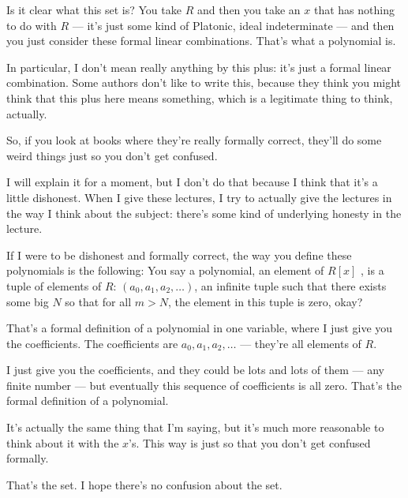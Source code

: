 \begin{speech}[01:20:48 - 01:22:05]
Is it clear what this set is? You take $R$ and then you take an $x$ that has nothing to do with $R$ --- it's just some kind of Platonic, ideal indeterminate --- and then you just consider these formal linear combinations. That's what a polynomial is.

In particular, I don't mean really anything by this plus: it's just a formal linear combination. Some authors don't like to write this, because they think you might think that this plus here means something, which is a legitimate thing to think, actually.

So, if you look at books where they're really formally correct,  they'll do some weird things just so you don't get confused.

I will explain it for a moment, but I don't do that because I think that it's a little dishonest. When I give these lectures, I try to actually give the lectures in the way I think about the subject: there's some kind of underlying honesty in the lecture.
\end{speech}

\begin{speech}[01:22:05 - 01:23:58]
If I were to be dishonest and formally correct, the way you define these polynomials is the following:
You say a polynomial, an element of $R[x]$ , is a tuple of elements of $R$: $(a_0, a_1, a_2, \dots)$,  an infinite tuple such that there exists some big $N$ so that for all $m > N$, the element in this tuple is zero, okay? 

That's a formal definition of a polynomial in one variable, where I just give you the coefficients. The coefficients are $a_0, a_1, a_2, \dots$ --- they're all elements of $R$. 

I just give you the coefficients, and they could be lots and lots of them --- any finite number --- but eventually this sequence of coefficients is all zero. That's the formal definition of a polynomial.

It's actually the same thing that I'm saying, but it's much more reasonable to think about it with the $x$'s. This way is just so that you don't get confused formally.

That's the set. I hope there's no confusion about the set.
\end{speech}

